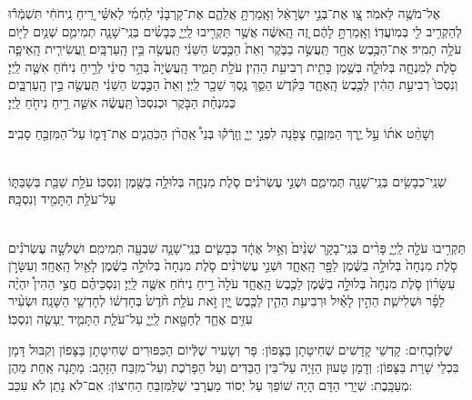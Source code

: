 \documentclass[twoside, openany, parskip=half, 11pt]{book}
\begin{document}

אֶל־מֹשֶׁ֥ה לֵּאמֹֽר׃ צַ֚ו אֶת־בְּנֵ֣י יִשְׂרָאֵ֔ל וְאָֽמַרְתָּ֖ אֲלֵהֶ֑ם אֶת־קָרְבָּנִ֨י לַחְמִ֜י לְאִשַּׁ֗י רֵ֚יחַ נִֽיחֹחִ֔י תִּשְׁמְֿר֕וּ לְהַקְרִ֥יב לִ֖י בְּמֽוֹעֲדֽוֹ׃ וְאָֽמַרְתָּ֣ לָהֶ֔ם זֶ֚ה הָֽאִשֶּׁ֔ה אֲשֶׁ֥ר תַּקְרִ֖יבוּ לַֽיְיָ֑ כְּבָשִׂ֨ים בְּנֵֽי־שָׁנָ֧ה תְמִימִ֛ם שְׁנַ֥יִם לַיּ֖וֹם עֹלָ֥ה תָמִֽיד׃ אֶת־הַכֶּ֥בֶשׂ אֶחָ֖ד תַּֽעֲשֶׂ֣ה בַבֹּ֑קֶר וְאֵת֙ הַכֶּ֣בֶשׂ הַשֵּׁנִ֔י תַּֽעֲשֶׂ֖ה בֵּ֥ין הָֽעַרְבָּֽיִם׃ וַֽעֲשִׂירִ֧ית הָֽאֵיפָ֛ה סֹ֖לֶת לְמִנְחָ֑ה בְּלוּלָ֛ה בְּשֶׁ֥מֶן כָּתִ֖ית רְבִיעִ֥ת הַהִֽין׃ עֹלַ֖ת תָּמִ֑יד הָֽעֲשֻׂיָה֙ בְּהַ֣ר סִינַ֔י לְרֵ֣יחַ נִיחֹ֔חַ אִשֶּׁ֖ה לַֽיְיָ׃ וְנִסְכּוֹ֙ רְבִיעִ֣ת הַהִ֔ין לַכֶּ֖בֶשׂ הָֽאֶחָ֑ד בַּקֹּ֗דֶשׁ הַסֵּ֛ךְ נֶ֥סֶךְ שֵׁכָ֖ר לַֽיְיָ׃ וְאֵת֙ הַכֶּ֣בֶשׂ הַשֵּׁנִ֔י תַּֽעֲשֶׂ֖ה בֵּ֣ין הָֽעַרְבָּ֑יִם כְּמִנְחַ֨ת הַבֹּ֤קֶר וּכְנִסְכּוֹ֙ תַּֽעֲשֶׂ֔ה אִשֵּׁ֛ה רֵ֥יחַ נִיחֹ֖חַ לַֽיְיָ׃
  
 וְשָׁחַ֨ט
אֹת֜וֹ עַ֣ל יֶ֧רֶךְ הַמִּזְבֵּ֛חַ צָפֹ֖נָה לִפְנֵ֣י יְיָ֑ וְזָֽרְֿק֡וּ בְּנֵי֩ אַֽהֲרֹ֨ן הַכֹּֽהֲנִ֧ים אֶת־דָּמ֛וֹ עַל־הַמִּזְבֵּ֖חַ סָבִֽיב׃

\\
שְׁנֵֽי־כְבָשִׂ֥ים בְּנֵֽי־שָׁנָ֖ה תְּמִימִ֑ם וּשְׁנֵ֣י עֶשְׂרֹנִ֗ים סֹ֧לֶת מִנְחָ֛ה בְּלוּלָ֥ה בַשֶּׁ֖מֶן וְנִסְכּֽוֹ׃ עֹלַ֥ת שַׁבַּ֖ת בְּשַׁבַּתּ֑וֹ עַל־עֹלַ֥ת הַתָּמִ֖יד וְנִסְכָּֽהּ׃

\\
תַּקְרִ֥יבוּ עֹלָ֖ה לַֽיְיָ֑ פָּרִ֨ים בְּנֵֽי־בָקָ֤ר שְׁנַ֨יִם֙ וְאַ֣יִל אֶחָ֔ד כְּבָשִׂ֧ים בְּנֵֽי־שָׁנָ֛ה שִׁבְעָ֖ה תְּמִימִֽם׃ וּשְׁלֹשָׁ֣ה עֶשְׂרֹנִ֗ים סֹ֤לֶת מִנְחָה֙ בְּלוּלָ֣ה בַשֶּׁ֔מֶן לַפָּ֖ר הָֽאֶחָ֑ד וּשְׁנֵ֣י עֶשְׂרֹנִ֗ים סֹ֤לֶת מִנְחָה֙ בְּלוּלָ֣ה בַשֶּׁ֔מֶן לָאַ֖יִל הָֽאֶחָֽד׃ וְעִשָּׂרֹ֣ן עִשָּׂר֗וֹן סֹ֤לֶת מִנְחָה֙ בְּלוּלָ֣ה בַשֶּׁ֔מֶן לַכֶּ֖בֶשׂ הָֽאֶחָ֑ד עֹלָה֙ רֵ֣יחַ נִיחֹ֔חַ אִשֶּׁ֖ה לַֽיְיָ׃ וְנִסְכֵּיהֶ֗ם חֲצִ֣י הַהִין֩ יִהְיֶ֨ה לַפָּ֜ר וּשְׁלִישִׁ֧ת הַהִ֣ין לָאַ֗יִל וּרְבִיעִ֥ת הַהִ֛ין לַכֶּ֖בֶשׂ יָ֑יִן זֹ֣את עֹלַ֥ת חֹ֨דֶשׁ֙ בְּחָדְשׁ֔וֹ לְחָדְשֵׁ֖י הַשָּׁנָֽה׃ וּשְׂעִ֨יר עִזִּ֥ים אֶחָ֛ד לְחַטָּ֖את לַֽיְיָ֑ עַל־עֹלַ֧ת הַתָּמִ֛יד יֵֽעָשֶׂ֖ה וְנִסְכּֽוֹ׃



שֶׁלִּזְבָחִים: קָדְשֵׁי קָדָשִׁים שְׁחִיטָתָן בַּצָּפוֹן: פָּר וְשָׂעִיר שֶׁלְּֿיוֹם הַכִּפּוּרִים שְׁחִיטָתָן בַּצָּפוֹן וְקִבּוּל דָּמָן בִּכְלֵי שָׁרֵת בַּצָּפוֹן: וְדָמָן טָעוּן הַזָּיָה עַל־בֵּין הַבַּדִּים וְעַל הַפָּרֹֽכֶת וְעַל־מִזְבַּח הַזָּהָב: מַתָּנָה אַֽחַת מֵהֶן מְעַכָּֽבֶת: שְׁיָרֵי הַדָּם הָיָה שׁוֹפֵךְ עַל יְסוֹד מַעֲרָבִי שֶׁלַּמִּזְבֵּחַ הַחִיצוֹן: אִם־לֹא נָתַן לֹא עִכֵּב:
\end{document}
